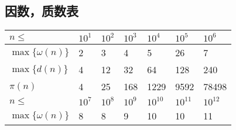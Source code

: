 \documentclass{article}
\begin{document}
\subsection{因数，质数表}
\begin{table}[H]
\centering
\begin{tabular}{|l|llllll|}
\hline
\rowcolor[HTML]{C0C0C0} 
$n\le$              & \multicolumn{1}{l|}{\cellcolor[HTML]{C0C0C0}$10^1$}  & \multicolumn{1}{l|}{\cellcolor[HTML]{C0C0C0}$10^2$}  & \multicolumn{1}{l|}{\cellcolor[HTML]{C0C0C0}$10^3$}  & \multicolumn{1}{l|}{\cellcolor[HTML]{C0C0C0}$10^4$}    & \multicolumn{1}{l|}{\cellcolor[HTML]{C0C0C0}$10^5$}  & \cellcolor[HTML]{C0C0C0}$10^6$ \\ \hline
$\max\{\omega(n)\}$ & \multicolumn{1}{l|}{2}                               & \multicolumn{1}{l|}{3}                               & \multicolumn{1}{l|}{4}                               & \multicolumn{1}{l|}{5}                                 & \multicolumn{1}{l|}{26}                              & 7                              \\ \hline
$\max\{d(n)\}$      & \multicolumn{1}{l|}{4}                               & \multicolumn{1}{l|}{12}                              & \multicolumn{1}{l|}{32}                              & \multicolumn{1}{l|}{64}                                & \multicolumn{1}{l|}{128}                             & 240                            \\ \hline
$\pi(n)$            & \multicolumn{1}{l|}{4}                               & \multicolumn{1}{l|}{25}                              & \multicolumn{1}{l|}{168}                             & \multicolumn{1}{l|}{1229}                              & \multicolumn{1}{l|}{9592}                            & 78498                          \\ \hline
\rowcolor[HTML]{C0C0C0} 
$n\le$              & \multicolumn{1}{l|}{\cellcolor[HTML]{C0C0C0}$10^7$}  & \multicolumn{1}{l|}{\cellcolor[HTML]{C0C0C0}$10^8$}  & \multicolumn{1}{l|}{\cellcolor[HTML]{C0C0C0}$10^9$}  & \multicolumn{1}{l|}{\cellcolor[HTML]{C0C0C0}$10^{10}$} & \multicolumn{1}{l|}{\cellcolor[HTML]{C0C0C0}$10^{11}$} & $10^{12}$                        \\ \hline
$\max\{\omega(n)\}$ & \multicolumn{1}{l|}{8}                               & \multicolumn{1}{l|}{8}                               & \multicolumn{1}{l|}{9}                               & \multicolumn{1}{l|}{10}                                & \multicolumn{1}{l|}{10}                              & 11                             \\ \hline

\end{tabular}
\end{table}
\end{document}
